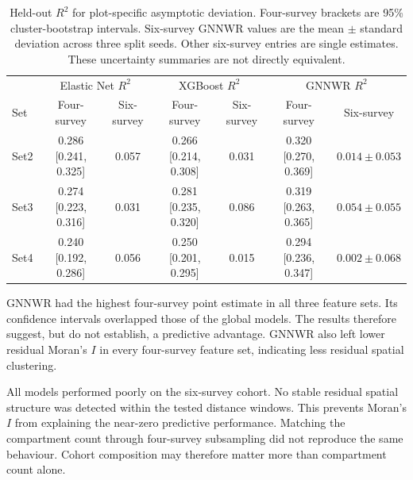 \begin{table}[!htbp]
\centering
\scriptsize
\renewcommand{\arraystretch}{1.1}
\begin{tabular}{lcc|cc|cc}
\toprule
& \multicolumn{2}{c|}{Elastic Net $R^2$}
& \multicolumn{2}{c|}{XGBoost $R^2$}
& \multicolumn{2}{c}{GNNWR $R^2$} \\
Set & Four-survey & Six-survey & Four-survey & Six-survey & Four-survey & Six-survey \\
\midrule
Set2 & 0.286 [0.241, 0.325] & 0.057 & 0.266 [0.214, 0.308] & 0.031
& 0.320 [0.270, 0.369] & $0.014\pm0.053$ \\
Set3 & 0.274 [0.223, 0.316] & 0.031 & 0.281 [0.235, 0.320] & 0.086
& 0.319 [0.263, 0.365] & $0.054\pm0.055$ \\
Set4 & 0.240 [0.192, 0.286] & 0.056 & 0.250 [0.201, 0.295] & 0.015
& 0.294 [0.236, 0.347] & $0.002\pm0.068$ \\
\bottomrule
\end{tabular}
\caption{Held-out $R^2$ for plot-specific asymptotic deviation. Four-survey brackets are 95\%
cluster-bootstrap intervals. Six-survey GNNWR values are the mean $\pm$ standard deviation across
three split seeds. Other six-survey entries are single estimates. These uncertainty summaries are
not directly equivalent.}
\label{tab:results-rq3}
\end{table}

GNNWR had the highest four-survey point estimate in all three feature sets. Its confidence
intervals overlapped those of the global models. The results therefore suggest, but do not
establish, a predictive advantage. GNNWR also left lower residual Moran's $I$ in every
four-survey feature set, indicating less residual spatial clustering.

All models performed poorly on the six-survey cohort. No stable residual spatial structure was
detected within the tested distance windows. This prevents Moran's $I$ from explaining the
near-zero predictive performance. Matching the compartment count through four-survey subsampling
did not reproduce the same behaviour. Cohort composition may therefore matter more than
compartment count alone.


